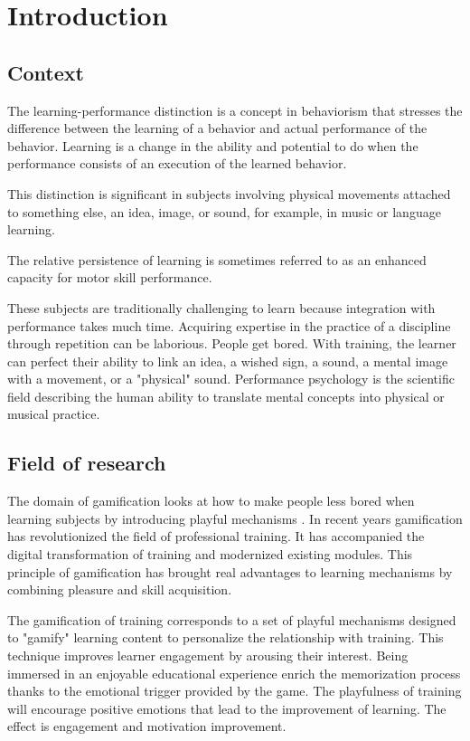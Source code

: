 \chapter{Introduction}

\section{Context}

The learning-performance distinction is a concept in behaviorism that stresses the difference between the learning of a behavior and actual performance of the behavior. Learning is a change in the ability and potential to do when the performance consists of an execution of the learned behavior. \cite{kantak2012learning}

This distinction is significant in subjects involving physical movements attached to something else, an idea, image, or sound, for example, in music or language learning.

The relative persistence of learning is sometimes referred to as an enhanced capacity for motor skill performance. \cite{kantak2012learning}

These subjects are traditionally challenging to learn because integration with performance takes much time. Acquiring expertise in the practice of a discipline through repetition can be laborious. People get bored.
With training, the learner can perfect their ability to link an idea, a wished sign, a sound, a mental image with a movement, or a "physical" sound. Performance psychology is the scientific field describing the human ability to translate mental concepts into physical or musical practice.

\section{Field of research}

The domain of gamification looks at how to make people less bored when learning subjects by introducing playful mechanisms \cite[]{saleem2022gamification}.
In recent years gamification has revolutionized the field of professional training. It has accompanied the digital transformation of training and modernized existing modules. This principle of gamification has brought real advantages to learning mechanisms by combining pleasure and skill acquisition.

The gamification of training corresponds to a set of playful mechanisms designed to "gamify" learning content to personalize the relationship with training. This technique improves learner engagement by arousing their interest. Being immersed in an enjoyable educational experience enrich the memorization process thanks to the emotional trigger provided by the game. The playfulness of training will encourage positive emotions that lead to the improvement of learning. The effect is engagement and motivation improvement.

